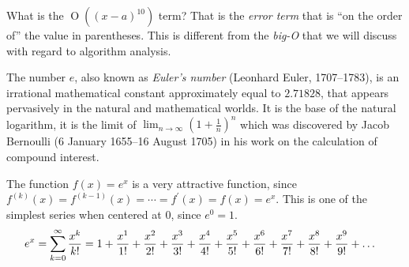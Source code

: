 What is the $\operatorname{O}\left((x-a)^{10}\right)$ term? That is the \emph{error term} that
is ``on the order of'' the value in parentheses. This is different from the
\emph{big-O} that we will discuss with regard to algorithm analysis.

The number $e$, also known as \emph{Euler's number} (Leonhard Euler,
1707--1783), is an irrational mathematical constant approximately equal to
$2.71828$, that appears pervasively in the natural and mathematical worlds. It
is the base of the natural logarithm, it is the limit of
$\lim_{n\rightarrow\infty} (1 + \frac{1}{n})^n$ which was discovered by Jacob
Bernoulli (6 January 1655--16 August 1705) in his work on the calculation of
compound interest.

The function $f(x)=e^x$ is a very attractive function, since $f^{(k)}(x) = f^{(k-1)}(x) = \cdots = f^\prime(x) = f(x) = e^x$.
This is one of the simplest series when centered at $0$, since $e^0 = 1$.
\begin{align*}
  e^x & = \sum_{k=0}^{\infty} \frac{x^k}{k!} = 1 + \frac{x^{1}}{1!} + \frac{x^{2}}{2!} +
  \frac{x^{3}}{3!} + \frac{x^{4}}{4!} + \frac{x^{5}}{5!} + \frac{x^{6}}{6!} + \frac{x^{7}}{7!} + \frac{x^{8}}{8!} +
  \frac{x^{9}}{9!} + \ldots
\end{align*}
